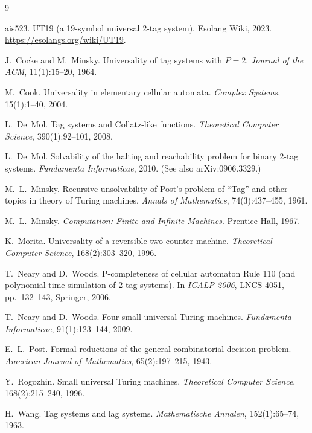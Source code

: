 \documentclass{article}
\theoremstyle{definition}
\theoremstyle{remark}
\begin{document}
\begin{thebibliography}{9}

ais523.
\newblock UT19 (a 19-symbol universal 2-tag system).
\newblock Esolang Wiki, 2023.
\newblock \url{https://esolangs.org/wiki/UT19}.

J.~Cocke and M.~Minsky.
\newblock Universality of tag systems with $P=2$.
\newblock \emph{Journal of the ACM}, 11(1):15--20, 1964.

M.~Cook.
\newblock Universality in elementary cellular automata.
\newblock \emph{Complex Systems}, 15(1):1--40, 2004.

L.~De~Mol.
\newblock Tag systems and Collatz-like functions.
\newblock \emph{Theoretical Computer Science}, 390(1):92--101, 2008.

L.~De~Mol.
\newblock Solvability of the halting and reachability problem for binary 2-tag systems.
\newblock \emph{Fundamenta Informaticae}, 2010.
\newblock (See also arXiv:0906.3329.)

M.~L.~Minsky.
\newblock Recursive unsolvability of Post's problem of ``Tag'' and other topics in theory of Turing machines.
\newblock \emph{Annals of Mathematics}, 74(3):437--455, 1961.

M.~L.~Minsky.
\newblock \emph{Computation: Finite and Infinite Machines}.
\newblock Prentice-Hall, 1967.

K.~Morita.
\newblock Universality of a reversible two-counter machine.
\newblock \emph{Theoretical Computer Science}, 168(2):303--320, 1996.

T.~Neary and D.~Woods.
\newblock P-completeness of cellular automaton Rule 110 (and polynomial-time simulation of 2-tag systems).
\newblock In \emph{ICALP 2006}, LNCS 4051, pp.~132--143, Springer, 2006.

T.~Neary and D.~Woods.
\newblock Four small universal Turing machines.
\newblock \emph{Fundamenta Informaticae}, 91(1):123--144, 2009.

E.~L.~Post.
\newblock Formal reductions of the general combinatorial decision problem.
\newblock \emph{American Journal of Mathematics}, 65(2):197--215, 1943.

Y.~Rogozhin.
\newblock Small universal Turing machines.
\newblock \emph{Theoretical Computer Science}, 168(2):215--240, 1996.

H.~Wang.
\newblock Tag systems and lag systems.
\newblock \emph{Mathematische Annalen}, 152(1):65--74, 1963.

\end{thebibliography}
\end{document}
